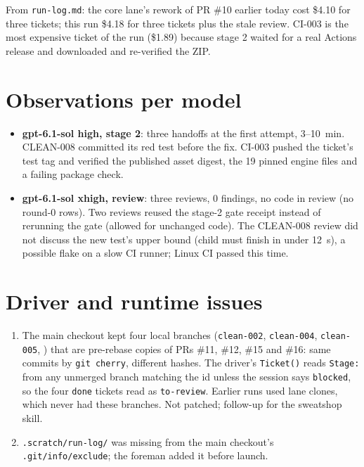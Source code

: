 \documentclass[11pt,a4paper]{article}
\begin{document}
From \texttt{run-log.md}: the core lane's rework of PR \#10 earlier today cost \$4.10 for three
tickets; this run \$4.18 for three tickets plus the stale review. CI-003 is the most expensive
ticket of the run (\$1.89) because stage 2 waited for a real Actions release and downloaded and
re-verified the ZIP.

\section*{Observations per model}

\begin{itemize}
  \item \textbf{gpt-6.1-sol high, stage 2}: three handoffs at the first attempt, 3--10~min.
        CLEAN-008 committed its red test before the fix. CI-003 pushed the ticket's test tag
        and verified the published asset digest, the 19 pinned engine files and a failing
        package check.
  \item \textbf{gpt-6.1-sol xhigh, review}: three reviews, 0 findings, no code in review (no
        round-0 rows). Two reviews reused the stage-2 gate receipt instead of rerunning the
        gate (allowed for unchanged code). The CLEAN-008 review did not discuss the new test's
        upper bound (child must finish in under 12~s), a possible flake on a slow CI runner;
        Linux CI passed this time.
\end{itemize}

\section*{Driver and runtime issues}

\begin{enumerate}
  \item The main checkout kept four local branches (\texttt{clean-002}, \texttt{clean-004},
        \texttt{clean-005}, ) that are pre-rebase
        copies of PRs \#11, \#12, \#15 and \#16: same commits by \texttt{git cherry}, different
        hashes. The driver's \texttt{Ticket()} reads \texttt{Stage:} from any unmerged branch
        matching the id unless the session says \texttt{blocked}, so the four \texttt{done}
        tickets read as \texttt{to-review}. Earlier runs used lane clones, which never had these
        branches. Not patched; follow-up for the sweatshop skill.
  \item \texttt{.scratch/run-log/} was missing from the main checkout's
        \texttt{.git/info/exclude}; the foreman added it before launch.
\end{enumerate}
\end{document}
